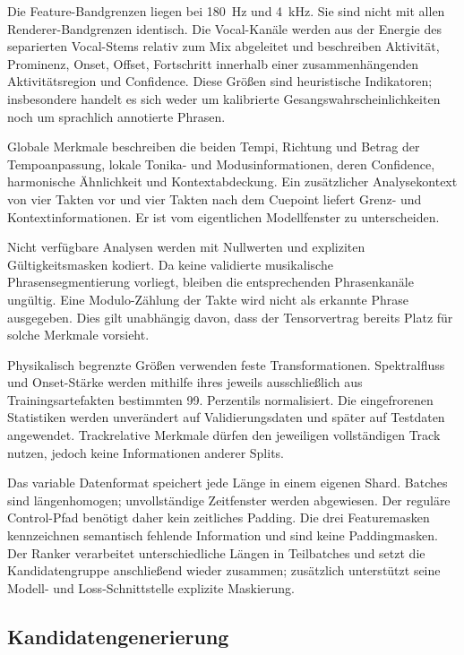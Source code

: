 Die Feature-Bandgrenzen liegen bei 180~Hz und 4~kHz. Sie sind nicht mit allen Renderer-Bandgrenzen identisch. Die Vocal-Kanäle werden aus der Energie des separierten Vocal-Stems relativ zum Mix abgeleitet und beschreiben Aktivität, Prominenz, Onset, Offset, Fortschritt innerhalb einer zusammenhängenden Aktivitätsregion und Confidence. Diese Größen sind heuristische Indikatoren; insbesondere handelt es sich weder um kalibrierte Gesangswahrscheinlichkeiten noch um sprachlich annotierte Phrasen.

Globale Merkmale beschreiben die beiden Tempi, Richtung und Betrag der Tempoanpassung, lokale Tonika- und Modusinformationen, deren Confidence, harmonische Ähnlichkeit und Kontextabdeckung. Ein zusätzlicher Analysekontext von vier Takten vor und vier Takten nach dem Cuepoint liefert Grenz- und Kontextinformationen. Er ist vom eigentlichen Modellfenster zu unterscheiden.

Nicht verfügbare Analysen werden mit Nullwerten und expliziten Gültigkeitsmasken kodiert. Da keine validierte musikalische Phrasensegmentierung vorliegt, bleiben die entsprechenden Phrasenkanäle ungültig. Eine Modulo-Zählung der Takte wird nicht als erkannte Phrase ausgegeben. Dies gilt unabhängig davon, dass der Tensorvertrag bereits Platz für solche Merkmale vorsieht.

Physikalisch begrenzte Größen verwenden feste Transformationen. Spektralfluss und Onset-Stärke werden mithilfe ihres jeweils ausschließlich aus Trainingsartefakten bestimmten 99. Perzentils normalisiert. Die eingefrorenen Statistiken werden unverändert auf Validierungsdaten und später auf Testdaten angewendet. Trackrelative Merkmale dürfen den jeweiligen vollständigen Track nutzen, jedoch keine Informationen anderer Splits.

Das variable Datenformat speichert jede Länge in einem eigenen Shard. Batches sind längenhomogen; unvollständige Zeitfenster werden abgewiesen. Der reguläre Control-Pfad benötigt daher kein zeitliches Padding. Die drei Featuremasken kennzeichnen semantisch fehlende Information und sind keine Paddingmasken. Der Ranker verarbeitet unterschiedliche Längen in Teilbatches und setzt die Kandidatengruppe anschließend wieder zusammen; zusätzlich unterstützt seine Modell- und Loss-Schnittstelle explizite Maskierung.

\subsection{Kandidatengenerierung}
\label{sec:methodik-kandidaten}

